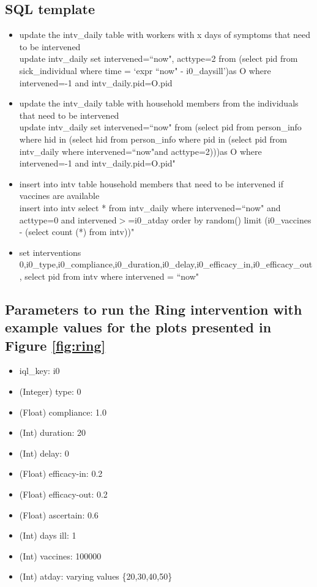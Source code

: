 \documentclass[11pt]{article}
\begin{document}
\subsection{SQL template}
\begin{itemize}
\item update the intv\_daily table with workers with x days of symptoms that need to be intervened\\
update intv\_daily set intervened=``now", acttype=2  from (select pid from sick\_individual where time = `expr ``now" - i0\_daysill')as O where intervened=-1 and intv\_daily.pid=O.pid

\item update the intv\_daily table with household members from the individuals that need to be intervened\\
update intv\_daily set intervened=``now" from (select pid from person\_info where hid in (select hid from person\_info where pid in (select pid from intv\_daily where intervened=``now"and acttype=2)))as O where intervened=-1 and intv\_daily.pid=O.pid"

\item insert into intv table household members that need to be intervened if vaccines are available\\
insert into intv select * from intv\_daily where intervened=``now" and acttype=0 and intervened$>$=i0\_atday order by random() limit (i0\_vaccines - (select count (*) from intv))"

\item set interventions\\
0,i0\_type,i0\_compliance,i0\_duration,i0\_delay,i0\_efficacy\_in,i0\_efficacy\_out, select pid from intv where intervened = ``now"
        
\end{itemize}
\subsection{Parameters to run the Ring intervention with example values for the plots presented in Figure \ref{fig:ring}}
\begin{itemize}
\item iql\_key: i0
\item (Integer) type: 0
\item (Float) compliance: 1.0
\item (Int) duration: 20
\item (Int) delay: 0
\item (Float) efficacy-in: 0.2
\item  (Float) efficacy-out: 0.2
\item (Float) ascertain: 0.6
\item (Int) days ill: 1
\item (Int) vaccines: 100000
\item (Int) atday: varying values \{20,30,40,50\}
\end{itemize}
\end{document}
